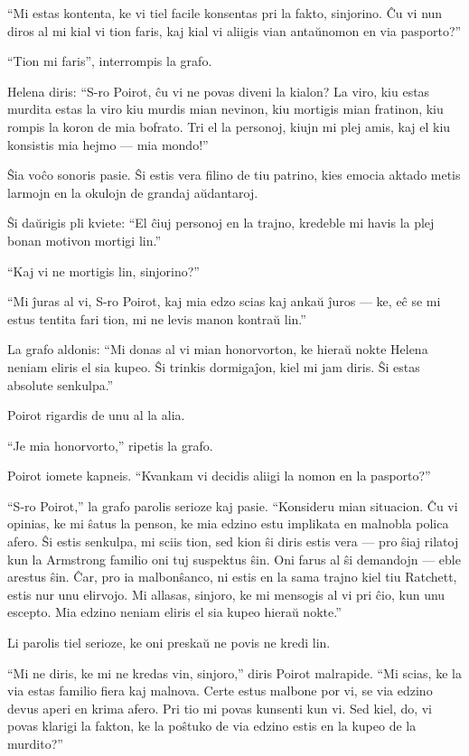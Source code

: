 ``Mi estas kontenta, ke vi tiel facile konsentas pri la fakto, sinjorino. Ĉu vi nun diros al mi kial vi tion faris, kaj kial vi aliigis vian antaŭnomon en via pasporto?''

``Tion mi faris'', interrompis la grafo.

Helena diris: ``S-ro Poirot, ĉu vi ne povas diveni la kialon? La viro, kiu estas murdita estas la viro kiu murdis mian nevinon, kiu mortigis mian fratinon, kiu rompis la koron de mia bofrato. Tri el la personoj, kiujn mi plej amis, kaj el kiu konsistis mia hejmo --- mia mondo!''

Ŝia voĉo sonoris pasie. Ŝi estis vera filino de tiu patrino, kies emocia aktado metis larmojn en la okulojn de grandaj aŭdantaroj.

Ŝi daŭrigis pli kviete: ``El ĉiuj personoj en la trajno, kredeble mi havis la plej bonan motivon mortigi lin.''

``Kaj vi ne mortigis lin, sinjorino?''

``Mi ĵuras al vi, S-ro Poirot, kaj mia edzo scias kaj ankaŭ ĵuros --- ke, eĉ se mi estus tentita fari tion, mi ne levis manon kontraŭ lin.''

La grafo aldonis: ``Mi donas al vi mian honorvorton, ke hieraŭ nokte Helena neniam eliris el sia kupeo. Ŝi trinkis dormigaĵon, kiel mi jam diris. Ŝi estas absolute senkulpa.''

Poirot rigardis de unu al la alia.

``Je mia honorvorto,'' ripetis la grafo.

Poirot iomete kapneis. ``Kvankam vi decidis aliigi la nomon en la pasporto?''

``S-ro Poirot,'' la grafo parolis serioze kaj pasie. ``Konsideru mian situacion. Ĉu vi opinias, ke mi ŝatus la penson, ke mia edzino estu implikata en malnobla polica afero. Ŝi estis senkulpa, mi sciis tion, sed kion ŝi diris estis vera --- pro ŝiaj rilatoj kun la Armstrong familio oni tuj suspektus ŝin. Oni farus al ŝi demandojn --- eble arestus ŝin. Ĉar, pro ia malbonŝanco, ni estis en la sama trajno kiel tiu Ratchett, estis nur unu elirvojo. Mi allasas, sinjoro, ke mi mensogis al vi pri ĉio, kun unu escepto. Mia edzino neniam eliris el sia kupeo hieraŭ nokte.''

Li parolis tiel serioze, ke oni preskaŭ ne povis ne kredi lin.

``Mi ne diris, ke mi ne kredas vin, sinjoro,'' diris Poirot malrapide. ``Mi scias, ke la via estas familio fiera kaj malnova. Certe estus malbone por vi, se via edzino devus aperi en krima afero. Pri tio mi povas kunsenti kun vi. Sed kiel, do, vi povas klarigi la fakton, ke la poŝtuko de via edzino estis en la kupeo de la murdito?''

